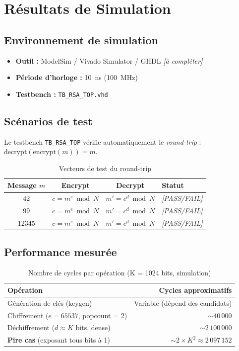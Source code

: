 \section{Résultats de Simulation}
\label{ch:sim}

\subsection{Environnement de simulation}
\begin{itemize}
  \item \textbf{Outil :} ModelSim / Vivado Simulator / GHDL
        \textit{[à compléter]}
  \item \textbf{Période d'horloge :} 10~ns (100~MHz)
  \item \textbf{Testbench :} \texttt{TB\_RSA\_TOP.vhd}
\end{itemize}

\subsection{Scénarios de test}

Le testbench \texttt{TB\_RSA\_TOP} vérifie automatiquement le
\textit{round-trip} : $\text{decrypt}(\text{encrypt}(m)) = m$.

\begin{table}[H]
\centering
\caption{Vecteurs de test du round-trip}
\begin{tabular}{cccl}
\toprule
\textbf{Message $m$} & \textbf{Encrypt} & \textbf{Decrypt} & \textbf{Statut} \\
\midrule
42    & $c = m^e \bmod N$ & $m' = c^d \bmod N$ & \textit{[PASS/FAIL]} \\
99    & $c = m^e \bmod N$ & $m' = c^d \bmod N$ & \textit{[PASS/FAIL]} \\
12345 & $c = m^e \bmod N$ & $m' = c^d \bmod N$ & \textit{[PASS/FAIL]} \\
\bottomrule
\end{tabular}
\end{table}

\subsection{Performance mesurée}

\begin{table}[H]
\centering
\caption{Nombre de cycles par opération (K = 1024 bits, simulation)}
\begin{tabular}{lr}
\toprule
\textbf{Opération} & \textbf{Cycles approximatifs} \\
\midrule
Génération de clés (keygen)                     & Variable (dépend des candidats) \\
Chiffrement ($e = 65537$, popcount = 2)         & $\sim 40\,000$ \\
Déchiffrement ($d \approx K$ bits, dense)       & $\sim 2\,100\,000$ \\
\textbf{Pire cas} (exposant tous bits à 1)      & $\sim 2 \times K^2 \approx 2\,097\,152$ \\
\bottomrule
\end{tabular}
\end{table}

